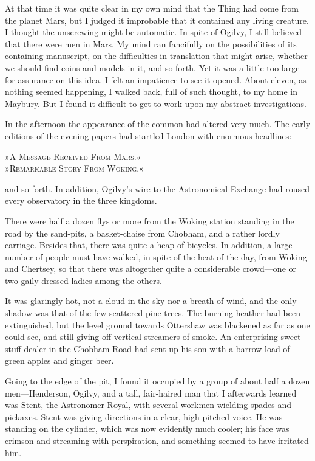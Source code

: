 At that time it was quite clear in my own mind that the Thing had come from the planet Mars, but I judged it improbable that it contained any living creature. I thought the unscrewing might be automatic. In spite of Ogilvy, I still believed that there were men in Mars. My mind ran fancifully on the possibilities of its containing manuscript, on the difficulties in translation that might arise, whether we should find coins and models in it, and so forth. Yet it was a little too large for assurance on this idea. I felt an impatience to see it opened. About eleven, as nothing seemed happening, I walked back, full of such thought, to my home in Maybury. But I found it difficult to get to work upon my abstract investigations.

In the afternoon the appearance of the common had altered very much. The early editions of the evening papers had startled London with enormous headlines:

\begin{center}\scshape
»A Message Received From Mars.«\\
»Remarkable Story From Woking,«
\end{center}

and so forth. In addition, Ogilvy's wire to the Astronomical Exchange had roused every observatory in the three kingdoms.

There were half a dozen flys or more from the Woking station standing in the road by the sand-pits, a basket-chaise from Chobham, and a rather lordly carriage. Besides that, there was quite a heap of bicycles. In addition, a large number of people must have walked, in spite of the heat of the day, from Woking and Chertsey, so that there was altogether quite a considerable crowd—one or two gaily dressed ladies among the others.

It was glaringly hot, not a cloud in the sky nor a breath of wind, and the only shadow was that of the few scattered pine trees. The burning heather had been extinguished, but the level ground towards Ottershaw was blackened as far as one could see, and still giving off vertical streamers of smoke. An enterprising sweet-stuff dealer in the Chobham Road had sent up his son with a barrow-load of green apples and ginger beer.

Going to the edge of the pit, I found it occupied by a group of about half a dozen men—Henderson, Ogilvy, and a tall, fair-haired man that I afterwards learned was Stent, the Astronomer Royal, with several workmen wielding spades and pickaxes. Stent was giving directions in a clear, high-pitched voice. He was standing on the cylinder, which was now evidently much cooler; his face was crimson and streaming with perspiration, and something seemed to have irritated him.


